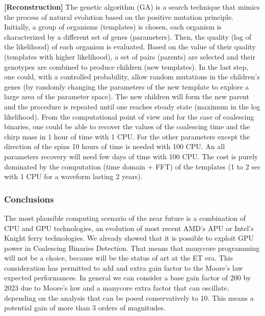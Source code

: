 {\bf [Reconstruction]}
The genetic algorithm (GA) is a search technique that mimics the process of natural evolution based on the positive mutation principle.
Initially, a group of organisms (templates) is chosen, each organism is characterized by a different set of genes (parameters). Then, the quality (log of the likelihood) of each organism is evaluated. Based on the value of their quality (templates with higher likelihood), a set of pairs (parents) are selected and their genotypes are combined to produce  children (new templates). In the last step, one could, with a controlled probability, allow random mutations in the children's genes (by randomly changing the parameters of the new template to explore a large area of the parameter space). The new children will form the new parent and the procedure is repeated until one reaches steady state (maximum in the log likelihood).
From the computational point of view and for the case of coalescing binaries, one could be able to recover the values of the coalescing time and the chirp mass in 1 hour of time with 1 CPU. For the other parameters except the direction of the spins 10 hours of time is needed with 100 CPU. An all parameters recovery will need  few days of time with 100 CPU.
The cost is purely dominated by the computation (time domain $+$ FFT) of the templates (1 to 2 sec with 1 CPU for a waveform lasting 2 years).
\FloatBarrier
\subsubsection{Conclusions}


The most plausible computing scenario of the near future is a combination of CPU and GPU technologies, an evolution of most recent AMD's APU or Intel's Knight ferry technologies.  We already showed that it is possible to exploit GPU power in Coalescing Binaries Detection. That means that manycore programming will not be a choice, because will be the status of art at the ET era. This consideration has permitted to add and extra gain factor to the Moore's law expected performances. In general we can consider a base gain factor of 200 by 2023 due to Moore's law and a manycore extra factor that can oscillate, depending on the analysis  that can be posed conservatively  to 10.
This means a potential gain of more than 3 orders of magnitudes.

